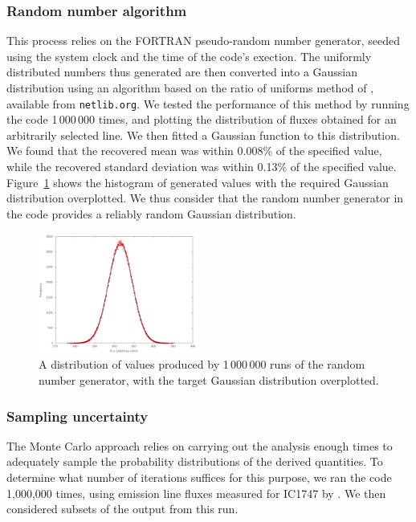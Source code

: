 \documentclass[useAMS,usenatbib]{mn2e}
\begin{document}
\subsubsection{Random number algorithm}

This process relies on the FORTRAN pseudo-random number generator, seeded using the system clock and the time of the code's exection.  The uniformly distributed numbers thus generated are then converted into a Gaussian distribution using an algorithm based on the ratio of uniforms method of \citet{Kinderman:1977:CGR:355744.355750}, available from \texttt{netlib.org}.  We tested the performance of this method by running the code 1\,000\,000 times, and plotting the distribution of fluxes obtained for an arbitrarily selected line.  We then fitted a Gaussian function to this distribution.  We found that the recovered mean was within 0.008\% of the specified value, while the recovered standard deviation was within 0.13\% of the specified value.  Figure~\ref{gaussiantest} shows the histogram of generated values with the required Gaussian distribution overplotted.  We thus consider that the random number generator in the code provides a reliably random Gaussian distribution.

\begin{figure}
\includegraphics[width=0.47\textwidth]{figures/gaussian_test.png}
\caption{A distribution of values produced by 1\,000\,000 runs of the random number generator, with the target Gaussian distribution overplotted.}
\label{gaussiantest}
\end{figure}

\subsubsection{Sampling uncertainty}

The Monte Carlo approach relies on carrying out the analysis enough times to adequately sample the probability distributions of the derived quantities.  To determine what number of iterations suffices for this purpose, we ran the code 1,000,000 times, using emission line fluxes measured for IC1747 by \citet{2005MNRAS.362..424W}.  We then considered subsets of the output from this run.
\end{document}

